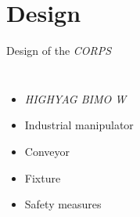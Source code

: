 \section{Design}
\begin{frame}{Design of the \textit{CORPS}}
\begin{columns}
    \begin{itemize}
        \item \textit{HIGHYAG BIMO W}
        \item Industrial manipulator
        \item Conveyor
        \item Fixture
        \item Safety measures
    \end{itemize}
\end{columns}
\end{frame}






